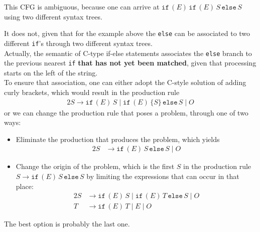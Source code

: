 \documentclass[docid=CA07]{tcom_CA}
\begin{document}
\setcounter{chapter}{6}
{

This CFG is ambiguous, because one can arrive at $\mathtt{if}\,(E)\,\mathtt{if}\,(E)\,S\,\mathtt{else}\,S$ using two different syntax trees.
\begin{center}
\begin{minipage}{0.45\textwidth}
	\begin{center}
	\end{center}
\end{minipage}%
\begin{minipage}{0.40\textwidth}
	\begin{center}
	\end{center}
\end{minipage}
\end{center}
It does not, given that for the example above the \texttt{else} can be associated to two different \texttt{if}'s through two different syntax trees.\\
Actually, the semantic of C-type if-else statements associates the \texttt{else} branch to the previous nearest \texttt{if} \textbf{that has not yet been matched}, given that processing starts on the left of the string.\\
To ensure that association, one can either adopt the C-style solution of adding curly brackets, which would result in the production rule
\begin{alignat*}{2}
	S \rightarrow \mathtt{if}\,(E)\,S\mid \mathtt{if}\,(E)\,\{S\}\,\mathtt{else}\,S\mid O
\end{alignat*}
or we can change the production rule that poses a problem, through one of two ways:
\begin{itemize}
	\item Eliminate the production that produces the problem, which yields
	\begin{alignat*}{2}
		S &\rightarrow \mathtt{if}\,(E)\,S\,\mathtt{else}\,S\mid O
	\end{alignat*}
	\item Change the origin of the problem, which is the first $S$ in the production rule $S \rightarrow \mathtt{if}\,(E)\,S\,\mathtt{else}\,S$ by limiting the expressions that can occur in that place:
	\begin{alignat*}{2}
		S &\rightarrow \mathtt{if}\,(E)\,S\mid \mathtt{if}\,(E)\,T\,\mathtt{else}\,S\mid O\\
		T &\rightarrow \mathtt{if}\,(E)\,T\mid E \mid  O 
	\end{alignat*}
\end{itemize}
The best option is probably the last one.
}
\end{document}
